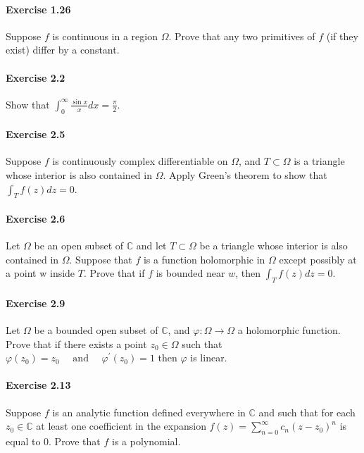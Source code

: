 \documentclass{article}
\begin{document}
\paragraph{Exercise 1.26} Suppose $f$ is continuous in a region $\Omega$. Prove that any two primitives of $f$ (if they exist) differ by a constant.

\paragraph{Exercise 2.2} Show that $\int_{0}^{\infty} \frac{\sin x}{x} d x=\frac{\pi}{2}$.

\paragraph{Exercise 2.5} Suppose $f$ is continuously complex differentiable on $\Omega$, and $T \subset \Omega$ is a triangle whose interior is also contained in $\Omega$. Apply Green’s theorem to show that $\int_T f(z) dz = 0$.

\paragraph{Exercise 2.6} Let $\Omega$ be an open subset of $\mathbb{C}$ and let $T \subset \Omega$ be a triangle whose interior is also contained in $\Omega$. Suppose that $f$ is a function holomorphic in $\Omega$ except possibly at a point w inside $T$. Prove that if $f$ is bounded near $w$, then $\int_T f(z) dz = 0$.

\paragraph{Exercise 2.9} Let $\Omega$ be a bounded open subset of $\mathbb{C}$, and $\varphi: \Omega \rightarrow \Omega$ a holomorphic function. Prove that if there exists a point $z_{0} \in \Omega$ such that $\varphi\left(z_{0}\right)=z_{0} \quad \text { and } \quad \varphi^{\prime}\left(z_{0}\right)=1$ then $\varphi$ is linear.

\paragraph{Exercise 2.13} Suppose $f$ is an analytic function defined everywhere in $\mathbb{C}$ and such that for each $z_0 \in \mathbb{C}$ at least one coefficient in the expansion $f(z) = \sum_{n=0}^\infty c_n(z - z_0)^n$ is equal to 0. Prove that $f$ is a polynomial.
\end{document}
